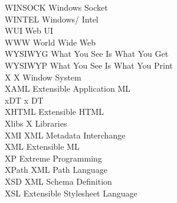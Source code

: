 \begin{tabbing}
    \>WINSOCK \>\>Windows Socket\\

    \>WINTEL \>\>Windows/ Intel\\





    \>WUI \>\>Web UI\\

    \>WWW \>\>World Wide Web\\

    \>WYSIWYG \>\>What You See Is What You Get\\

    \>WYSIWYP \>\>What You See Is What You Print\\

    \>X \>\>X Window System\\

    \>XAML \>\>Extensible Application ML\\

    \>xDT \>\>x DT\\

    \>XHTML \>\>Extensible HTML\\

    \>Xlibs \>\>X Libraries\\

    \>XMI \>\>XML Metadata Interchange\\

    \>XML \>\>Extensible ML\\


    \>XP \>\>Extreme Programming\\

    \>XPath \>\>XML Path Language\\

    \>XSD \>\>XML Schema Definition\\

    \>XSL \>\>Extensible Stylesheet Language\\


\end{tabbing}
